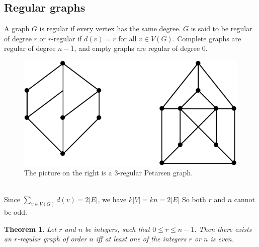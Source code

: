 \documentclass[12pt,a4paper]{article}
\newtheorem{thm}{Theorem}[section]
\theoremstyle{definition}
\begin{document}
\subsection{Regular graphs}
A graph $G$ is regular if every vertex has the same degree. $G$ is said to be regular of degree $r$ or $r$-regular  if $d(v)=r$ for all $v \in V(G)$. Complete graphs are regular of degree $n-1$, and empty graphs are regular of degree $0$.
 \begin{figure}[hbtp]
\centering
\includegraphics[scale=.7]{images/graph12.pdf}
\caption{The picture on the right is a $3$-regular Petarsen graph.}
\end{figure}\\
Since $\sum_{v \in V(G)} d(v)=2 |E|$, we have $k|V|=kn=2|E|$ So both $r$ and $n$ cannot be odd.
\begin{thm} Let $r$ and $n$ be integers,  such that $0 \leq r \leq n-1$. Then there exists an $r$-regular graph of order $n$ iff at least one of the integers $r$ or $n$ is even. 
\end{thm}
\end{document}

